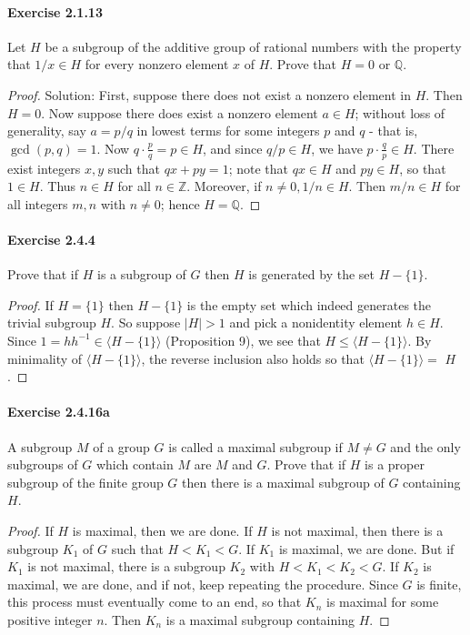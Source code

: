 \documentclass{article}
\theoremstyle{definition}
\begin{document}
\paragraph{Exercise 2.1.13} Let $H$ be a subgroup of the additive group of rational numbers with the property that $1 / x \in H$ for every nonzero element $x$ of $H$. Prove that $H=0$ or $\mathbb{Q}$.
\begin{proof}
    Solution: First, suppose there does not exist a nonzero element in $H$. Then $H=0$.
Now suppose there does exist a nonzero element $a \in H$; without loss of generality, say $a=p / q$ in lowest terms for some integers $p$ and $q$ - that is, $\operatorname{gcd}(p, q)=1$. Now $q \cdot \frac{p}{q}=p \in H$, and since $q / p \in H$, we have $p \cdot \frac{q}{p} \in H$. There exist integers $x, y$ such that $q x+p y=1$; note that $q x \in H$ and $p y \in H$, so that $1 \in H$. Thus $n \in H$ for all $n \in \mathbb{Z}$. Moreover, if $n \neq 0,1 / n \in H$. Then $m / n \in H$ for all integers $m, n$ with $n \neq 0$; hence $H=\mathbb{Q}$.
\end{proof}



\paragraph{Exercise 2.4.4} Prove that if $H$ is a subgroup of $G$ then $H$ is generated by the set $H-\{1\}$.
\begin{proof}
    If $H=\{1\}$ then $H-\{1\}$ is the empty set which indeed generates the trivial subgroup $H$. So suppose $|H|>1$ and pick a nonidentity element $h \in H$. Since $1=h h^{-1} \in\langle H-\{1\}\rangle$ (Proposition 9), we see that $H \leq\langle H-\{1\}\rangle$. By minimality of $\langle H-\{1\}\rangle$, the reverse inclusion also holds so that $\langle H-\{1\}\rangle=$ $H$.
\end{proof}



\paragraph{Exercise 2.4.16a} A subgroup $M$ of a group $G$ is called a maximal subgroup if $M \neq G$ and the only subgroups of $G$ which contain $M$ are $M$ and $G$. Prove that if $H$ is a proper subgroup of the finite group $G$ then there is a maximal subgroup of $G$ containing $H$.
\begin{proof}
If $H$ is maximal, then we are done. If $H$ is not maximal, then there is a subgroup $K_1$ of $G$ such that $H<K_1<G$. If $K_1$ is maximal, we are done. But if $K_1$ is not maximal, there is a subgroup $K_2$ with $H<K_1<K_2<G$. If $K_2$ is maximal, we are done, and if not, keep repeating the procedure. Since $G$ is finite, this process must eventually come to an end, so that $K_n$ is maximal for some positive integer $n$. Then $K_n$ is a maximal subgroup containing $H$.
\end{proof}
\end{document}
